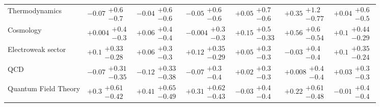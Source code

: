 \begin{tabular}{lllllll}
Thermodynamics                            &         $-0.07\substack{+0.6 \\ -0.7}$ &         $-0.04\substack{+0.6 \\ -0.6}$ &         $-0.05\substack{+0.6 \\ -0.6}$ &         $+0.05\substack{+0.7 \\ -0.6}$ &        $+0.35\substack{+1.2 \\ -0.77}$ &         $+0.04\substack{+0.6 \\ -0.5}$ \\
Cosmology                                 &        $+0.004\substack{+0.4 \\ -0.3}$ &         $+0.06\substack{+0.4 \\ -0.4}$ &        $-0.004\substack{+0.3 \\ -0.3}$ &        $+0.15\substack{+0.5 \\ -0.33}$ &   $\bm{+0.56}\substack{+0.6 \\ -0.54}$ &        $+0.1\substack{+0.44 \\ -0.29}$ \\
Electroweak sector                        &        $+0.1\substack{+0.33 \\ -0.28}$ &         $+0.06\substack{+0.3 \\ -0.3}$ &       $+0.12\substack{+0.35 \\ -0.29}$ &         $+0.05\substack{+0.3 \\ -0.3}$ &         $-0.03\substack{+0.4 \\ -0.4}$ &        $+0.1\substack{+0.35 \\ -0.24}$ \\
QCD                                       &       $-0.07\substack{+0.31 \\ -0.35}$ &       $-0.12\substack{+0.33 \\ -0.38}$ &         $-0.07\substack{+0.3 \\ -0.4}$ &         $+0.02\substack{+0.3 \\ -0.3}$ &        $+0.008\substack{+0.4 \\ -0.4}$ &         $+0.03\substack{+0.3 \\ -0.3}$ \\
Quantum Field Theory                      &        $+0.3\substack{+0.61 \\ -0.42}$ &       $+0.41\substack{+0.65 \\ -0.49}$ &       $+0.31\substack{+0.62 \\ -0.43}$ &         $-0.03\substack{+0.4 \\ -0.4}$ &       $+0.22\substack{+0.61 \\ -0.48}$ &         $-0.01\substack{+0.4 \\ -0.4}$ \\

\end{tabular}
